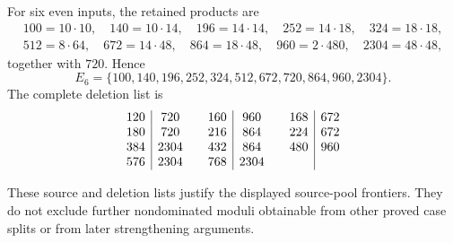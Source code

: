 For six even inputs, the retained products are
\[
\begin{gathered}
100=10\cdot10,\quad140=10\cdot14,\quad196=14\cdot14,
\quad252=14\cdot18,\quad324=18\cdot18,\\
512=8\cdot64,\quad672=14\cdot48,\quad864=18\cdot48,
\quad960=2\cdot480,\quad2304=48\cdot48,
\end{gathered}
\]
together with $720$.  Hence
\[
E_6=\{100,140,196,252,324,512,672,720,864,960,2304\}.
\]
The complete deletion list is
\[
\begin{array}{c|c@{\qquad}c|c@{\qquad}c|c}
120&720 &160&960 &168&672\\
180&720 &216&864 &224&672\\
384&2304&432&864&480&960\\
576&2304&768&2304&&
\end{array}
\]

These source and deletion lists justify the displayed source-pool frontiers.
They do not exclude further nondominated moduli obtainable from other proved
case splits or from later strengthening arguments.
